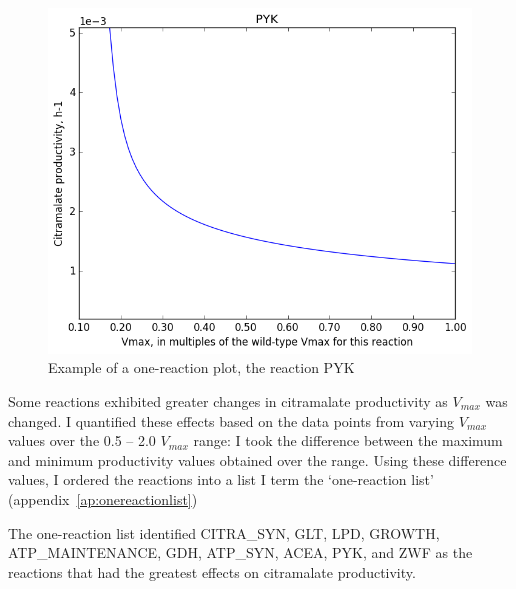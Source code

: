 \documentclass[parskip=full, numbers=noenddot]{scrreprt}
\begin{document}

\begin{figure}[h]
  \centering
  \includegraphics[scale=0.5]{onereacsample}
  \caption{Example of a one-reaction plot, the reaction PYK}
  \label{fig:onereacsample}
\end{figure}

Some reactions exhibited greater changes in citramalate productivity as $V_{max}$ was changed. I quantified these effects based on the data points from varying $V_{max}$ values over the 0.5 -- 2.0 $V_{max}$ range: I took the difference between the maximum and minimum productivity values obtained over the range. Using these difference values, I ordered the reactions into a list I term the `one-reaction list' (appendix~\ref{ap:onereactionlist})

The one-reaction list identified CITRA\_SYN, GLT, LPD, GROWTH, ATP\_MAINTENANCE, GDH, ATP\_SYN, ACEA, PYK, and ZWF as the reactions that had the greatest effects on citramalate productivity. %
\end{document}
